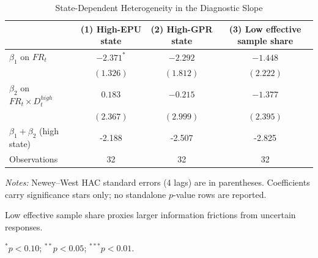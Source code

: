 \begin{table}[htbp]
\centering
\begin{threeparttable}
\caption{State-Dependent Heterogeneity in the Diagnostic Slope}
\label{tab:heterogeneity_interactions}
{\small
\begin{tabular}{lccc}
\toprule
 & (1) High-EPU state & (2) High-GPR state & (3) Low effective sample share \\
\midrule
$\beta_1$ on $FR_t$ & $-2.371^{*}$ & $-2.292$ & $-1.448$ \\
 & $(1.326)$ & $(1.812)$ & $(2.222)$ \\
\addlinespace
$\beta_2$ on $FR_t \times D_t^{high}$ & $0.183$ & $-0.215$ & $-1.377$ \\
 & $(2.367)$ & $(2.999)$ & $(2.395)$ \\
\addlinespace
$\beta_1 + \beta_2$ (high state) & -2.188 & -2.507 & -2.825 \\
Observations & 32 & 32 & 32 \\
\bottomrule
\end{tabular}
}
\begin{tablenotes}[flushleft]
\footnotesize
\item \textit{Notes:} Newey--West HAC standard errors (4 lags) are in parentheses. Coefficients carry significance stars only; no standalone $p$-value rows are reported.
\item Low effective sample share proxies larger information frictions from uncertain responses.
\item $^{*}p<0.10$; $^{**}p<0.05$; $^{***}p<0.01$.
\end{tablenotes}
\end{threeparttable}
\end{table}

